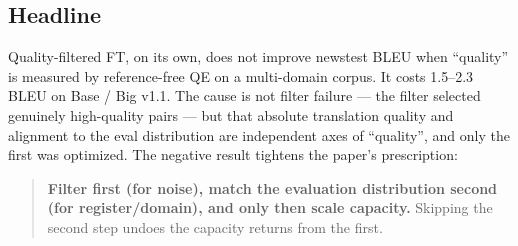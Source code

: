 \subsection{Headline}
Quality-filtered FT, on its own, does not improve newstest BLEU when ``quality'' is measured by reference-free QE on a multi-domain corpus. It costs 1.5--2.3 BLEU on Base / Big v1.1. The cause is not filter failure --- the filter selected genuinely high-quality pairs --- but that absolute translation quality and alignment to the eval distribution are independent axes of ``quality'', and only the first was optimized. The negative result tightens the paper's prescription:

\begin{quote}
\textbf{Filter first (for noise), match the evaluation distribution second (for register/domain), and only then scale capacity.} Skipping the second step undoes the capacity returns from the first.
\end{quote}
